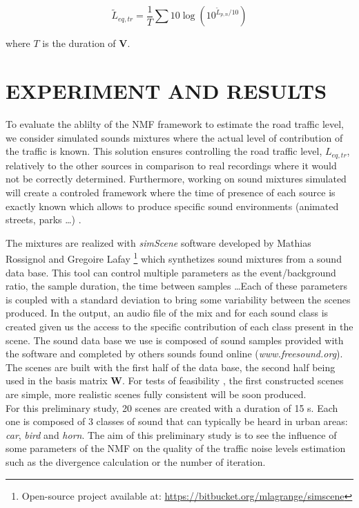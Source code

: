 \documentclass{article}
\begin{document}
\begin{sloppy}
\begin{equation}\label{eq:Leq}
\tilde{L}_{eq,tr} = \frac{1}{T} \sum 10\log \left(10^{\tilde{L}_{p,n}/10}\right)
\end{equation}

where $T$ is the duration of $\mathbf{V}$.\\

\section{EXPERIMENT AND RESULTS}\label{sec:experiment}

To evaluate the ablilty of the NMF framework to estimate the road traffic level, we consider simulated sounds mixtures where the actual level of contribution of the traffic is known. This solution ensures controlling the road traffic level, $L_{eq,tr}$, relatively to the other sources in comparison to real recordings where it would not be correctly determined. Furthermore, working on sound mixtures simulated will create a controled framework where the time of presence of each source is exactly known which allows to produce specific sound environments (animated streets, parks \dots) . 

The mixtures are realized with \textit{simScene} software developed by Mathias Rossignol and Gregoire Lafay \cite{simScene} \footnote{Open-source project available at: \url{https://bitbucket.org/mlagrange/simscene}} which synthetizes sound mixtures from a sound data base. This tool can control multiple parameters as the event/background ratio, the sample duration, the time between samples \dots Each of these parameters is coupled with a standard deviation to bring some variability between the scenes produced. In the output, an audio file of the mix and for each sound class is created given us the access to the specific contribution of each class present in the scene. The sound data base we use is composed of sound samples provided with the software and completed by others sounds found online (\textit{www.freesound.org}). The scenes are built with the first half of the data base, the second half being used in the basis matrix $\mathbf{W}$. For tests of feasibility , the first constructed scenes are simple, more realistic scenes fully consistent will be soon produced.\\

For this preliminary study, 20 scenes are created with a duration of 15 s. Each one is composed of 3 classes of sound that can typically be heard in urban areas: \textit{car}, \textit{bird} and \textit{horn}. The aim of this preliminary study is to see the influence of some parameters of the NMF on the quality of the traffic noise levels estimation such as the divergence calculation or the number of iteration.\\


\end{sloppy}
\end{document}

